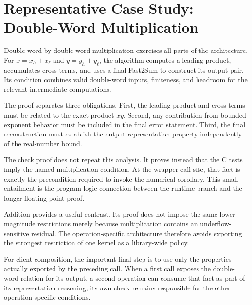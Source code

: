 \section{Representative Case Study: Double-Word Multiplication}
\label{sec:case-study}

Double-word by double-word multiplication exercises all parts of the
architecture.  For $x=x_h+x_\ell$ and $y=y_h+y_\ell$, the algorithm computes a
leading product, accumulates cross terms, and uses a final Fast2Sum to construct
its output pair.  Its condition combines valid double-word inputs, finiteness,
and headroom for the relevant intermediate computations.

The proof separates three obligations.  First, the leading product and cross
terms must be related to the exact product $xy$.  Second, any contribution from
bounded-exponent behavior must be included in the final error statement.
Third, the final reconstruction must establish the output representation
property independently of the real-number bound.

The check proof does not repeat this analysis.  It proves instead that the C
tests imply the named multiplication condition.  At the wrapper call site,
that fact is exactly the precondition required to invoke the numerical
corollary.  This small entailment is the program-logic connection between the
runtime branch and the longer floating-point proof.

Addition provides a useful contrast.  Its proof does not impose the same lower
magnitude restrictions merely because multiplication contains an
underflow-sensitive residual.  The operation-specific architecture therefore
avoids exporting the strongest restriction of one kernel as a library-wide
policy.

For client composition, the important final step is to use only the properties
actually exported by the preceding call.  When a first call exposes the
double-word relation for its output, a second operation can consume that fact
as part of its representation reasoning; its own check remains responsible for
the other operation-specific conditions.
